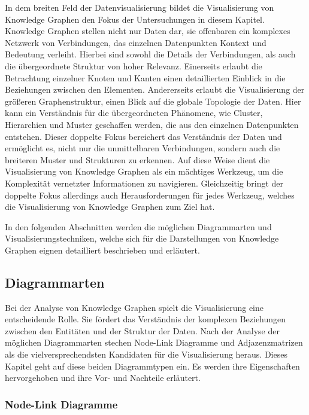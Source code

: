 In dem breiten Feld der Datenvisualisierung bildet die Visualisierung von Knowledge Graphen den Fokus der Untersuchungen in diesem Kapitel. Knowledge Graphen stellen nicht nur Daten dar, sie offenbaren ein komplexes Netzwerk von Verbindungen, das einzelnen Datenpunkten Kontext und Bedeutung verleiht. Hierbei sind sowohl die Details der Verbindungen, als auch die übergeordnete Struktur von hoher Relevanz. Einerseits erlaubt die Betrachtung einzelner Knoten und Kanten einen detaillierten Einblick in die Beziehungen zwischen den Elementen. Andererseits erlaubt die Visualisierung der größeren Graphenstruktur, einen Blick auf die globale Topologie der Daten. Hier kann ein Verständnis für die übergeordneten Phänomene, wie Cluster, Hierarchien und Muster geschaffen werden, die aus den einzelnen Datenpunkten entstehen. Dieser doppelte Fokus bereichert das Verständnis der Daten und ermöglicht es, nicht nur die unmittelbaren Verbindungen, sondern auch die breiteren Muster und Strukturen zu erkennen. Auf diese Weise dient die Visualisierung von Knowledge Graphen als ein mächtiges Werkzeug, um die Komplexität vernetzter Informationen zu navigieren. Gleichzeitig bringt der doppelte Fokus allerdings auch Herausforderungen für jedes Werkzeug, welches die Visualisierung von Knowledge Graphen zum Ziel hat.

In den folgenden Abschnitten werden die möglichen Diagrammarten und Visualisierungstechniken, welche sich für die Darstellungen von Knowledge Graphen eignen detailliert beschrieben und erläutert.

\subsection{Diagrammarten}

Bei der Analyse von Knowledge Graphen spielt die Visualisierung eine entscheidende Rolle. Sie fördert das Verständnis der komplexen Beziehungen zwischen den Entitäten und der Struktur der Daten. Nach der Analyse der möglichen Diagrammarten stechen Node-Link Diagramme und Adjazenzmatrizen als die vielversprechendsten Kandidaten für die Visualisierung heraus. Dieses Kapitel geht auf diese beiden  Diagrammtypen ein. Es werden ihre Eigenschaften hervorgehoben und ihre Vor- und Nachteile erläutert.

\subsubsection{Node-Link Diagramme}

